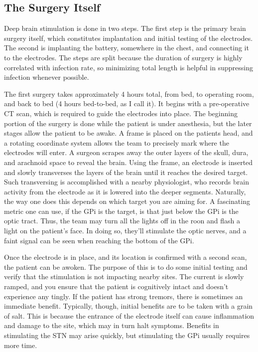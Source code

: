 \subsection{The Surgery Itself}

Deep brain stimulation is done in two steps. The first step is the primary brain surgery itself, which constitutes implantation and initial testing of the electrodes. The second is implanting the battery, somewhere in the chest, and connecting it to the electrodes. The steps are split because the duration of surgery is highly correlated with infection rate, so minimizing total length is helpful in suppressing infection whenever possible.\newline

The first surgery takes approximately 4 hours total, from bed, to operating room, and back to bed (4 hours bed-to-bed, as I call it). It begins with a pre-operative CT scan, which is required to guide the electrodes into place. The beginning portion of the surgery is done while the patient is under anesthesia, but the later stages allow the patient to be awake. A frame is placed on the patients head, and a rotating coordinate system allows the team to precisely mark where the electrodes will enter. A surgeon scrapes away the outer layers of the skull, dura, and arachnoid space to reveal the brain. Using the frame, an electrode is inserted and slowly transverses the layers of the brain until it reaches the desired target. Such transversing is accomplished with a nearby physiologist, who records brain activity from the electrode as it is lowered into the deeper segments. Naturally, the way one does this depends on which target you are aiming for. A fascinating metric one can use, if the GPi is the target, is that just below the GPi is the optic tract. Thus, the team may turn all the lights off in the roon and flash a light on the patient's face. In doing so, they'll stimulate the optic nerves, and a faint signal can be seen when reaching the bottom of the GPi.\newline

Once the electrode is in place, and its location is confirmed with a second scan, the patient can be awoken. The purpose of this is to do some initial testing and verify that the stimulation is not impacting nearby sites. The current is slowly ramped, and you ensure that the patient is cognitively intact and doesn't experience any tingly. If the patient has strong tremors, there is sometimes an immediate benefit. Typically, though, initial benefits are to be taken with a grain of salt. This is because the entrance of the electrode itself can cause inflammation and damage to the site, which may in turn halt symptoms. Benefits in stimulating the STN may arise quickly, but stimulating the GPi usually requires more time. 


